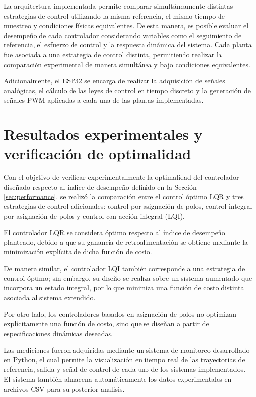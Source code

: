 \documentclass[12pt,letterpaper,twoside]{article}
\begin{document}
La arquitectura implementada permite comparar simultáneamente distintas estrategias de control utilizando la misma referencia, el mismo tiempo de muestreo y condiciones físicas equivalentes. De esta manera, es posible evaluar el desempeño de cada controlador considerando variables como el seguimiento de referencia, el esfuerzo de control y la respuesta dinámica del sistema. Cada planta fue asociada a una estrategia de control distinta, permitiendo realizar la comparación experimental de manera simultánea y bajo condiciones equivalentes.

Adicionalmente, el ESP32 se encarga de realizar la adquisición de señales analógicas, el cálculo de las leyes de control en tiempo discreto y la generación de señales PWM aplicadas a cada una de las plantas implementadas.

\section{Resultados experimentales y verificación de optimalidad}

Con el objetivo de verificar experimentalmente la optimalidad del controlador diseñado respecto al índice de desempeño definido en la Sección \ref{sec:performance}, se realizó la comparación entre el control óptimo LQR y tres estrategias de control adicionales: control por asignación de polos, control integral por asignación de polos y control con acción integral (LQI).

El controlador LQR se considera óptimo respecto al índice de desempeño planteado, debido a que su ganancia de retroalimentación se obtiene mediante la minimización explícita de dicha función de costo.

De manera similar, el controlador LQI también corresponde a una estrategia de control óptimo; sin embargo, su diseño se realiza sobre un sistema aumentado que incorpora un estado integral, por lo que minimiza una función de costo distinta asociada al sistema extendido.

Por otro lado, los controladores basados en asignación de polos no optimizan explícitamente una función de costo, sino que se diseñan a partir de especificaciones dinámicas deseadas.

Las mediciones fueron adquiridas mediante un sistema de monitoreo desarrollado en Python, el cual permite la visualización en tiempo real de las trayectorias de referencia, salida y señal de control de cada uno de los sistemas implementados. El sistema también almacena automáticamente los datos experimentales en archivos CSV para su posterior análisis.
\end{document}
